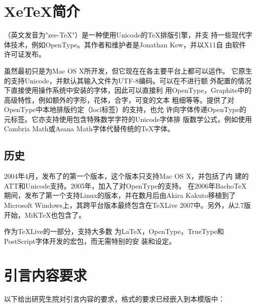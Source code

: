 \section{XeTeX简介}
\XeTeX{}（英文发音为"zee-\TeX{}"）是一种使用Unicode的\TeX{}排版引擎，并支
持一些现代字体技术，例如OpenType。其作者和维护者是Jonathan Kew，并以X11自
由软件许可证发布。

虽然\XeTeX{}最初只是为Mac OS X所开发，但它现在在各主要平台上都可以运作。
它原生的支持Unicode，并默认其输入文件为UTF-8编码。\XeTeX{}可以在不进行额
外配置的情况下直接使用操作系统中安装的字体，因此可以直接利
用OpenType，Graphite中的高级特性，例如额外的字形，花体，合字，可变的文本
粗细等等。\XeTeX{}提供了对OpenType中本地排版约定（locl标签）的支持，也允
许向字体传递OpenType的元标签。它亦支持使用包含特殊数学字符的Unicode字体排
版数学公式，例如使用Cambria Math或Asana Math字体代替传统的\TeX{}字体。


\subsection{历史}
2004年4月，发布了\XeTeX{}的第一个版本，这个版本只支持Mac OS X，并包括了内
建的ATT和Unicode支持。2005年，加入了对OpenType的支持。
在2006年Bacho\TeX{}期间，发布了第一个支持Linux的版本，并在数月后由Akira
Kakuto移植到了Microsoft Windows上，其跨平台版本最终包含在\TeX{}Live
2007中。另外，从2.7版开始，MiK\TeX{}也包含了\XeTeX{}。

作为\TeX{}Live的一部分，\XeTeX{}支持大多数
为\LaTeX{}，OpenType，TrueType和PostScript字体开发的宏包，而无需特别的安
装和设定。


\section{引言内容要求}
以下给出研究生院对引言内容的要求，格式的要求已经嵌入到本模版中：
\song